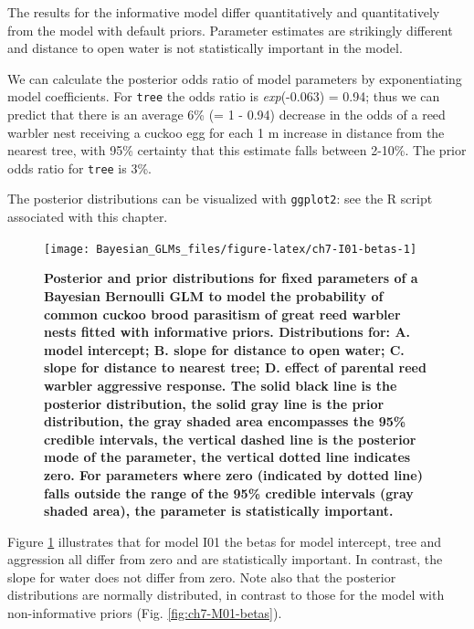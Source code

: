 \documentclass[
]{book}
\begin{document}
The results for the informative model differ quantitatively and quantitatively from the model with default priors. Parameter estimates are strikingly different and distance to open water is not statistically important in the model.

We can calculate the posterior odds ratio of model parameters by exponentiating model coefficients. For \texttt{tree} the odds ratio is \emph{exp}(-0.063) = 0.94; thus we can predict that there is an average 6\% (= 1 - 0.94) decrease in the odds of a reed warbler nest receiving a cuckoo egg for each 1 m increase in distance from the nearest tree, with 95\% certainty that this estimate falls between 2-10\%. The prior odds ratio for \texttt{tree} is 3\%.

The posterior distributions can be visualized with \texttt{ggplot2}: see the R script associated with this chapter.



\begin{figure}

{\centering \texttt{[image: Bayesian\_GLMs\_files/figure-latex/ch7-I01-betas-1]} 

}

\caption{\textbf{Posterior and prior distributions for fixed parameters of a Bayesian Bernoulli GLM to model the probability of common cuckoo brood parasitism of great reed warbler nests fitted with informative priors. Distributions for: A. model intercept; B. slope for distance to open water; C. slope for distance to nearest tree; D. effect of parental reed warbler aggressive response. The solid black line is the posterior distribution, the solid gray line is the prior distribution, the gray shaded area encompasses the 95\% credible intervals, the vertical dashed line is the posterior mode of the parameter, the vertical dotted line indicates zero. For parameters where zero (indicated by dotted line) falls outside the range of the 95\% credible intervals (gray shaded area), the parameter is statistically important.}}\label{fig:ch7-I01-betas}
\end{figure}

Figure \ref{fig:ch7-I01-betas} illustrates that for model I01 the betas for model intercept, tree and aggression all differ from zero and are statistically important. In contrast, the slope for water does not differ from zero. Note also that the posterior distributions are normally distributed, in contrast to those for the model with non-informative priors (Fig. \ref{fig:ch7-M01-betas}).
\end{document}
